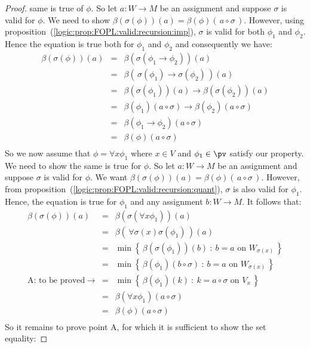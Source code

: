 \begin{proof}
same is true of $\phi$. So let $a:W\to M$ be an assignment and
suppose $\sigma$ is valid for $\phi$. We need to show
$\beta(\sigma(\phi))(a)=\beta(\phi)(\,a\circ\sigma\,)$. However,
using proposition~(\ref{logic:prop:FOPL:valid:recursion:imp}),
$\sigma$ is valid for both $\phi_{1}$ and $\phi_{2}$. Hence the
equation is true both for $\phi_{1}$ and $\phi_{2}$ and consequently
we have:
    \begin{eqnarray*}
    \beta(\sigma(\phi))(a)&=&\beta(\sigma(\phi_{1}\to\phi_{2}))(a)\\
    &=&\beta(\,\sigma(\phi_{1})\to\sigma(\phi_{2})\,)(a)\\
    &=&\beta(\sigma(\phi_{1}))(a)\to\beta(\sigma(\phi_{2}))(a)\\
    &=&\beta(\phi_{1})(a\circ\sigma)\to\beta(\phi_{2})(a\circ\sigma)\\
    &=&\beta(\phi_{1}\to\phi_{2})(a\circ\sigma)\\
    &=&\beta(\phi)(a\circ\sigma)\\
    \end{eqnarray*}
So we now assume that $\phi=\forall x\phi_{1}$ where $x\in V$ and
$\phi_{1}\in\pv$ satisfy our property. We need to show the same is
true for $\phi$. So let $a:W\to M$ be an assignment and suppose
$\sigma$ is valid for $\phi$. We want
$\beta(\sigma(\phi))(a)=\beta(\phi)(\,a\circ\sigma\,)$. However,
from proposition~(\ref{logic:prop:FOPL:valid:recursion:quant}),
$\sigma$ is also valid for $\phi_{1}$. Hence, the equation is true
for $\phi_{1}$ and any assignment $b:W\to M$. It follows that:
    \begin{eqnarray*}
    \beta(\sigma(\phi))(a)&=&\beta(\sigma(\forall x\phi_{1}))(a)\\
    &=&\beta(\,\forall\sigma(x)\sigma(\phi_{1})\,)(a)\\
    &=&\min\left\{\,\beta(\sigma(\phi_{1}))(b)\ :\ b=a\mbox{\ on\ }W_{\sigma(x)}\,\right\}\\
    &=&\min\left\{\,\beta(\phi_{1})(b\circ\sigma)\ :\ b=a\mbox{\ on\ }W_{\sigma(x)}\,\right\}\\
    \mbox{A: to be proved}\ \rightarrow
    &=&\min\left\{\,\beta(\phi_{1})(k)\ :\ k=a\circ\sigma\mbox{\ on\ }V_{x}\,\right\}\\
    &=&\beta(\forall x\phi_{1})(a\circ\sigma)\\
    &=&\beta(\phi)(a\circ\sigma)\\
    \end{eqnarray*}
So it remains to prove point A, for which it is sufficient to show
the set equality:

\end{proof}
